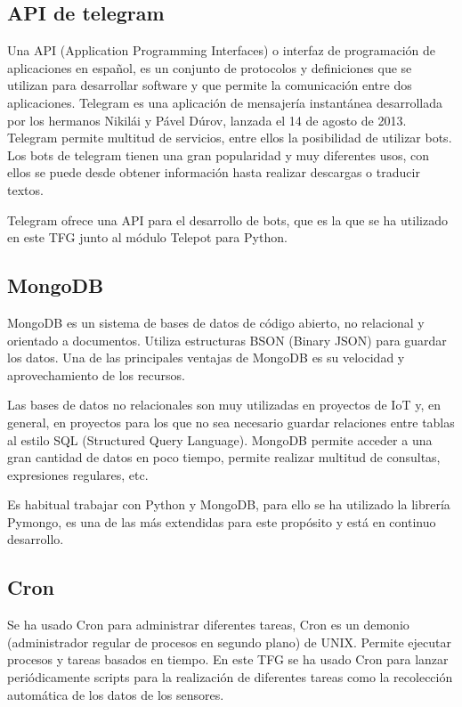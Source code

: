 \documentclass[a4paper, 12pt, oneside]{book}
\begin{document}
\subsection{API de telegram}
\label{subsec:api telegram}

Una API (Application Programming Interfaces) o interfaz de programación de aplicaciones en español, es un conjunto de protocolos y definiciones que se utilizan para desarrollar software y que permite la comunicación entre dos aplicaciones. Telegram es una aplicación de mensajería instantánea desarrollada por los hermanos Nikilái y Pável Dúrov, lanzada el 14 de agosto de 2013. Telegram permite multitud de servicios, entre ellos la posibilidad de utilizar bots. Los bots de telegram tienen una gran popularidad y muy diferentes usos, con ellos se puede desde obtener información hasta realizar descargas o traducir textos.

Telegram ofrece una API para el desarrollo de bots, que es la que se ha utilizado en este TFG junto al módulo Telepot para Python.

\subsection{MongoDB}
\label{subsec:mongodb}

MongoDB es un sistema de bases de datos de código abierto, no relacional y orientado a documentos. Utiliza estructuras BSON (Binary JSON) para guardar los datos. Una de las principales ventajas de MongoDB es su velocidad y aprovechamiento de los recursos.

Las bases de datos no relacionales son muy utilizadas en proyectos de IoT y, en general, en proyectos para los que no sea necesario guardar relaciones entre tablas al estilo SQL (Structured Query Language). MongoDB permite acceder a una gran cantidad de datos en poco tiempo, permite realizar multitud de consultas, expresiones regulares, etc.

Es habitual trabajar con Python y MongoDB, para ello se ha utilizado la librería Pymongo, es una de las más extendidas para este propósito y está en continuo desarrollo.

\subsection{Cron}
\label{subsec: cron}
Se ha usado Cron para administrar diferentes tareas, Cron es un demonio (administrador regular de procesos en segundo plano) de UNIX. Permite ejecutar procesos y tareas basados en tiempo.
En este TFG se ha usado Cron para lanzar periódicamente scripts para la realización de diferentes tareas como la recolección automática de los datos de los sensores.
 
\end{document}
